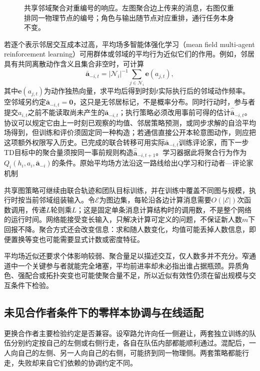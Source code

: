 \begin{figure}[htbp]
 \centering
 
 \caption{共享邻域聚合对重编号的响应。左图聚合边上传来的消息，右图仅重排同一物理节点的编号；角色与输出随节点对应重排，通行任务本身不变。}
 \label{fig:rl-multi-agent-graph}
\end{figure}

若逐个表示邻居交互成本过高，平均场多智能体强化学习（mean field multi-agent reinforcement learning）可用群体或邻域的平均行为近似它们的作用。例如，邻居具有共同离散动作含义且集合非空时，可计算
\[
 \bar{\bm a}_{-i,t}
 =|\mathcal N_i|^{-1}\sum_{j\in\mathcal N_i}\bm e(a_{j,t}),
\]
其中$\bm e(a_{j,t})$为动作独热向量，求平均后得到时刻$t$实际执行后的邻域动作频率。空邻域另约定$\bar{\bm a}_{-i,t}=\bm0$，这只是无邻居标记，不是概率分布。同时行动时，参与者提交$a_{i,t}$之前不能读取尚未产生的$\bar{\bm a}_{-i,t}$；执行策略必须改用事前可得的估计$\widehat{\bar{\bm a}}_{-i,t}$。协议可以规定它由上一时刻已观察的均值、邻居策略预测，或同步求解的自洽平均场得到，但训练和评价须固定同一种构造；若通信直接公开本轮意图动作，则应把这项额外权限写入历史。已完成的联合转移可用实际$\bar{\bm a}_{-i,t}$训练评论家，而下一步TD目标中的聚合量须按同一事前规则构造$\widehat{\bar{\bm a}}_{-i,t+1}$。学习器据此将聚合行为作为$Q_i(h_i,a_i,\bar{\bm a}_{-i})$的条件。原始平均场方法沿这一路线给出Q学习和行动者—评论家机制

共享图策略可继续由联合轨迹和团队目标训练，并在训练中覆盖不同图与规模，执行时按当前邻域组装输入。令$\mathcal E$为图边集，每轮沿各边计算消息需要$O(|\mathcal E|)$次函数调用，传递$L$轮则乘$L$；这是固定单条消息计算结构时的调用数，不是整个网络的运行时间。网络能接受变长输入，只解决计算可定义的问题，不保证新人数$m$下回报不降。聚合方式还会改变信息：求和随人数变化，均值可能丢掉人数信息，即便置换等变也可能需要显式计数或密度特征。

平均场近似还要求个体影响较弱、聚合量足以描述交互，仅人数多并不充分。窄通道中一个关键参与者就能完全堵塞，平均前进率却未必指出谁占据瓶颈。异质角色、强配合或拓扑突变也可能使聚合量不足，所以近似有效性仍须在留出规模与交互条件下检验。

\subsection{未见合作者条件下的零样本协调与在线适配}
\label{sec:rl-multi-agent-new-partners}

更换合作者主要检验约定是否兼容。设窄路允许向任一侧避让，两套独立训练的队伍分别约定按自己的左侧或右侧行走，各自在队伍内部都能顺利通过。混配后，一人向自己的左侧、另一人向自己的右侧，可能挤到同一物理侧。两套策略都能行走，失败却来自它们依赖的协调约定不同。

